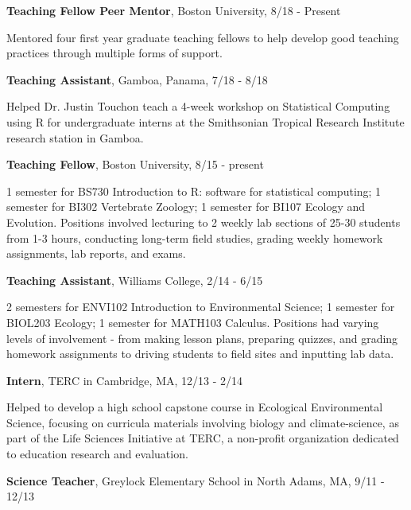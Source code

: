 \documentclass[margin,line]{res}
\begin{document}
\begin{resume}
{\bf Teaching Fellow Peer Mentor}, Boston University, 8/18 - Present

\vspace{-.43cm}

{Mentored four first year graduate teaching fellows to help develop good teaching practices through multiple forms of support.}

{\bf Teaching Assistant}, Gamboa, Panama, 7/18 - 8/18

\vspace{-.43cm}

{Helped Dr. Justin Touchon teach a 4-week workshop on Statistical Computing using R for undergraduate interns at the Smithsonian Tropical Research Institute research station in Gamboa.}

\vspace{-.1cm}
{\bf Teaching Fellow},  Boston University, 8/15 - present 

\vspace{-.43cm}
{1 semester for BS730 Introduction to R: software for statistical computing; 1 semester for BI302 Vertebrate Zoology; 1 semester for BI107 Ecology and Evolution. Positions involved lecturing to 2 weekly lab sections of 25-30 students from 1-3 hours, conducting long-term field studies, grading weekly homework assignments, lab reports, and exams. }

\vspace{-.1cm}
{\bf Teaching Assistant},  Williams College, 2/14 - 6/15 

\vspace{-.43cm}
{2 semesters for ENVI102 Introduction to Environmental Science; 1 semester for BIOL203 Ecology; 1 semester for MATH103 Calculus. Positions had varying levels of involvement - from making lesson plans, preparing quizzes, and grading homework assignments to driving students to field sites and inputting lab data.}

\vspace{-.1cm}
{\bf Intern},  TERC in Cambridge, MA, 12/13 - 2/14

\vspace{-.43cm}
{Helped to develop a high school capstone course in Ecological Environmental Science, focusing on curricula materials involving biology and climate-science, as part of the Life Sciences Initiative at TERC, a non-profit organization dedicated to education research and evaluation. }

\vspace{-.1cm}
{\bf Science Teacher},  Greylock Elementary School in North Adams, MA, 9/11 - 12/13


\end{resume}
\end{document}
